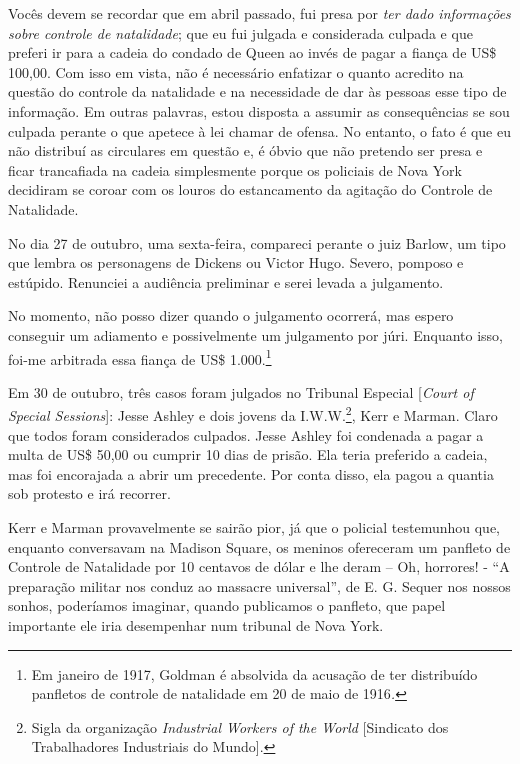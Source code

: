 Vocês devem se recordar que em abril passado, fui presa por \emph{ter
dado informações sobre controle de natalidade}; que eu fui julgada e
considerada culpada e que preferi ir para a cadeia do condado de Queen
ao invés de pagar a fiança de US\$ 100,00. Com isso em vista, não é
necessário enfatizar o quanto acredito na questão do controle da
natalidade e na necessidade de dar às pessoas esse tipo de informação.
Em outras palavras, estou disposta a assumir as consequências se sou
culpada perante o que apetece à lei chamar de ofensa. No entanto, o fato
é que eu não distribuí as circulares em questão e, é óbvio que não
pretendo ser presa e ficar trancafiada na cadeia simplesmente porque os
policiais de Nova York decidiram se coroar com os louros do estancamento
da agitação do Controle de Natalidade.

\asterisc

No dia 27 de outubro, uma sexta-feira, compareci perante o juiz Barlow,
um tipo que lembra os personagens de Dickens ou Victor Hugo. Severo,
pomposo e estúpido. Renunciei a audiência preliminar e serei levada a
julgamento.

No momento, não posso dizer quando o julgamento ocorrerá, mas espero
conseguir um adiamento e possivelmente um julgamento por júri. Enquanto
isso, foi-me arbitrada essa fiança de US\$ 1.000.\footnote{Em janeiro de
  1917, Goldman é absolvida da acusação de ter distribuído panfletos de
  controle de natalidade em 20 de maio de 1916\emph{.}}

Em 30 de outubro, três casos foram julgados no Tribunal Especial
{[}\emph{Court of Special Sessions}{]}: Jesse Ashley e dois jovens da
I.W.W.\footnote{Sigla da organização \emph{Industrial Workers of the
  World} {[}Sindicato dos Trabalhadores Industriais do Mundo{]}.}, Kerr
e Marman. Claro que todos foram considerados culpados. Jesse Ashley foi
condenada a pagar a multa de US\$ 50,00 ou cumprir 10 dias de prisão.
Ela teria preferido a cadeia, mas foi encorajada a abrir um precedente.
Por conta disso, ela pagou a quantia sob protesto e irá recorrer.

Kerr e Marman provavelmente se sairão pior, já que o policial
testemunhou que, enquanto conversavam na Madison Square, os meninos
ofereceram um panfleto de Controle de Natalidade por 10 centavos de
dólar e lhe deram -- Oh, horrores! - ``A preparação militar nos conduz
ao massacre universal'', de E. G. Sequer nos nossos sonhos, poderíamos
imaginar, quando publicamos o panfleto, que papel importante ele iria
desempenhar num tribunal de Nova York.

